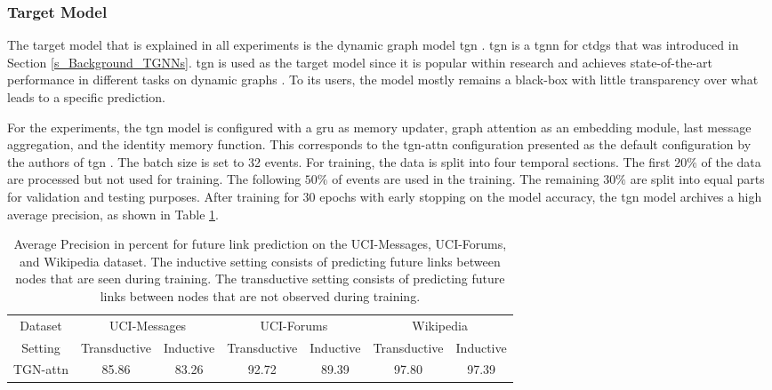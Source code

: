 \subsubsection{Target Model}
\label{s_Evaluation_Setup_TargetModel}

The target model that is explained in all experiments is the dynamic graph model \gls{tgn} \cite{rossi_temporal_2020}. \gls{tgn} is a \gls{tgnn} for \glspl{ctdg} that was introduced in Section \ref{s_Background_TGNNs}. \gls{tgn} is used as the target model since it is popular within research \cite{souza_provably_2022} and achieves state-of-the-art performance in different tasks on dynamic graphs \cite{rossi_temporal_2020, souza_provably_2022}. To its users, the model mostly remains a black-box with little transparency over what leads to a specific prediction.

For the experiments, the \gls{tgn} model is configured with a \gls{gru} as memory updater, graph attention as an embedding module, last message aggregation, and the identity memory function. This corresponds to the \gls{tgn}-attn configuration presented as the default configuration by the authors of \gls{tgn} \cite{rossi_temporal_2020}. The batch size is set to 32 events. For training, the data is split into four temporal sections. The first $20\%$ of the data are processed but not used for training. The following $50\%$ of events are used in the training. The remaining $30\%$ are split into equal parts for validation and testing purposes. After training for $30$ epochs with early stopping on the model accuracy, the \gls{tgn} model archives a high average precision, as shown in Table \ref{t_TGNTrainingPerformance}.

\begin{table}[ht]
    \small
    \centering
    \begin{tabular}{ccccccc}
    \hline
         Dataset &  \multicolumn{2}{c}{UCI-Messages} & \multicolumn{2}{c}{UCI-Forums}&  \multicolumn{2}{c}{Wikipedia}\\
         Setting &  Transductive&  Inductive & Transductive&  Inductive&  Transductive& Inductive\\
    \hline
         TGN-attn& 85.86 & 83.26 & 92.72&  89.39&  97.80& 97.39\\
    \hline
    \end{tabular}
    \caption{Average Precision in percent for future link prediction on the UCI-Messages, UCI-Forums, and Wikipedia dataset. The inductive setting consists of predicting future links between nodes that are seen during training. The transductive setting consists of predicting future links between nodes that are not observed during training.}
    \label{t_TGNTrainingPerformance}
\end{table}

